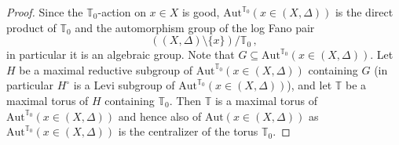 \documentclass[12pt]{amsart}
\theoremstyle{definition}
\newcommand{\bT}{\mathbb{T}}
\newcommand{\bG}{\mathbb{G}}
\newcommand{\Aut}{\mathrm{Aut}}
\numberwithin{equation}{section}
\begin{document}
\begin{proof}
Since the $\bT_0$-action on $x\in X$ is good, $\Aut^{\bT_0}(x\in (X,\Delta))$ is the direct product of $\mathbb T_0$ and the automorphism group of the log Fano pair 
\[
((X,\Delta)\setminus\{x\})/\bT_0\, ,
\]
in particular it is an algebraic group. Note that $G\subseteq \Aut^{\bT_0}(x\in (X,\Delta))$. Let $H$ be a maximal reductive subgroup of $\Aut^{\bT_0}(x\in (X,\Delta))$ containing $G$ (in particular $H^\circ$ is a Levi subgroup of $\Aut^{\bT_0}(x\in (X,\Delta))$), and let $\bT$ be a maximal torus of $H$ containing $\bT_0$. Then $\bT$ is a maximal torus of $\Aut^{\bT_0}(x\in (X,\Delta))$ and hence also of $\Aut(x\in (X,\Delta))$ as $\Aut^{\bT_0}(x\in (X,\Delta))$ is the centralizer of the torus $\bT_0$. 


\end{proof}
\end{document}

